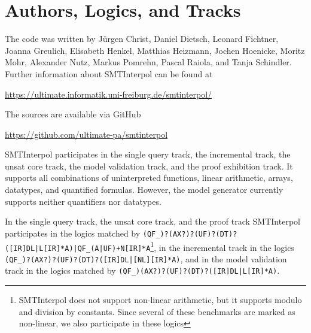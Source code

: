 \documentclass[a4paper]{easychair}
\newcommand\SI{SMTInterpol\xspace}
\begin{document}
\section*{Authors, Logics, and Tracks}
The code was written by J{\"u}rgen Christ, Daniel Dietsch, Leonard Fichtner, Joanna Greulich, Elisabeth Henkel, Matthias Heizmann, Jochen Hoenicke, Moritz Mohr, Alexander Nutz, Markus Pomrehn, Pascal Raiola, and Tanja Schindler.
Further information about \SI can be found at
\begin{center}
  \url{https://ultimate.informatik.uni-freiburg.de/smtinterpol/}
\end{center}
The sources are available via GitHub
\begin{center}
  \url{https://github.com/ultimate-pa/smtinterpol}
\end{center}

\SI participates in the single query track, the incremental track, the unsat core track, the model validation track, and the proof exhibition track.
It supports all combinations of uninterpreted functions, linear arithmetic, arrays, datatypes, and quantified formulas.
However, the model generator currently supports neither quantifiers nor datatypes.

In the single query track, the unsat core track, and the proof track \SI participates in the logics matched by
\verb!(QF_)?(AX?)?(UF)?(DT)?([IR]DL|L[IR]*A)|QF_(A|UF)+N[IR]*A!\footnote{\SI does not support non-linear arithmetic, but it supports modulo and division by constants.  Since several of these benchmarks are marked as non-linear, we also participate in these logics}, 
in the incremental track in the logics
\verb!(QF_)?(AX?)?(UF)?(DT)?([IR]DL|[NL][IR]*A)!,
and in the model validation track in the logics matched by
\verb!(QF_)(AX?)?(UF)?(DT)?([IR]DL|L[IR]*A)!.



\end{document}

